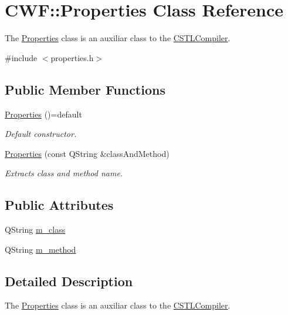 \hypertarget{class_c_w_f_1_1_properties}{\section{C\+W\+F\+:\+:Properties Class Reference}
\label{class_c_w_f_1_1_properties}
}


The \hyperlink{class_c_w_f_1_1_properties}{Properties} class is an auxiliar class to the \hyperlink{class_c_w_f_1_1_c_s_t_l_compiler}{C\+S\+T\+L\+Compiler}.  




{\ttfamily \#include $<$properties.\+h$>$}

\subsection*{Public Member Functions}
\begin{DoxyCompactItemize}
\item 
\hyperlink{class_c_w_f_1_1_properties_a417638a2312fba16104f19bc59190b35}{Properties} ()=default
\begin{DoxyCompactList}\small\item\em Default constructor. \end{DoxyCompactList}\item 
\hyperlink{class_c_w_f_1_1_properties_ad37244d75ca8ae82b8122b2f5d6952a2}{Properties} (const Q\+String \&class\+And\+Method)
\begin{DoxyCompactList}\small\item\em Extracts class and method name. \end{DoxyCompactList}\end{DoxyCompactItemize}
\subsection*{Public Attributes}
\begin{DoxyCompactItemize}
\item 
Q\+String \hyperlink{class_c_w_f_1_1_properties_ad77aa99c8e2ea4afe6300d739ba22308}{m\+\_\+class}
\item 
Q\+String \hyperlink{class_c_w_f_1_1_properties_a70682c472acdeef56e50a79f2436833e}{m\+\_\+method}
\end{DoxyCompactItemize}


\subsection{Detailed Description}
The \hyperlink{class_c_w_f_1_1_properties}{Properties} class is an auxiliar class to the \hyperlink{class_c_w_f_1_1_c_s_t_l_compiler}{C\+S\+T\+L\+Compiler}. 

